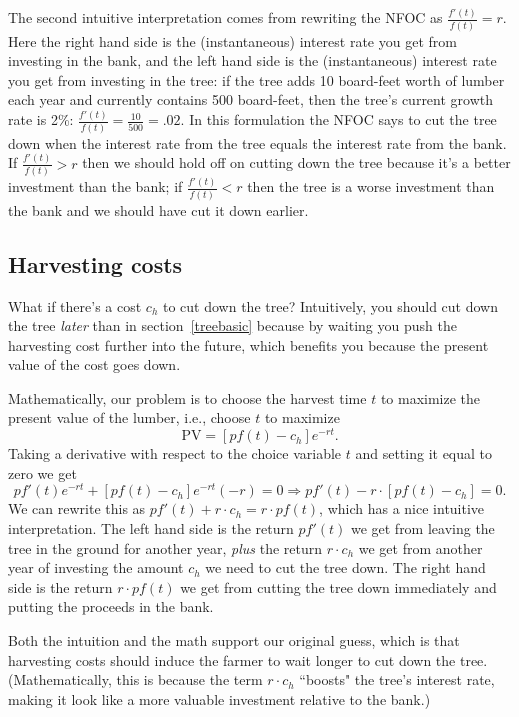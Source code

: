 The second intuitive interpretation comes from rewriting the NFOC as \linebreak $\displaystyle \frac{f'(t)}{f(t)}=r$. Here the right hand side is the (instantaneous) interest rate you get from investing in the bank, and the left hand side is the (instantaneous) interest rate you get from investing in the tree: if the tree adds 10 board-feet worth of lumber each year and currently contains 500 board-feet, then the tree's current growth rate is 2\%: $\displaystyle \frac{f'(t)}{f(t)}=\frac{10}{500}=.02.$ In this formulation the NFOC says to cut the tree down when the interest rate from the tree equals the interest rate from the bank. If $\displaystyle \frac{f'(t)}{f(t)}>r$ then we should hold off on cutting down the tree because it's a better investment than the bank; if $\displaystyle \frac{f'(t)}{f(t)}<r$ then the tree is a worse investment than the bank and we should have cut it down earlier.

\subsection*{Harvesting costs}

What if there's a cost $c_h$ to cut down the tree? Intuitively, you should cut down the tree \emph{later} than in section~\ref{treebasic} because by waiting you push the harvesting cost further into the future, which benefits you because the present value of the cost goes down.

Mathematically, our problem is to choose the harvest time $t$ to maximize the present value of the lumber, i.e., choose $t$ to maximize
\[
\mbox{PV}=[pf(t)-c_h]e^{-rt}.
\]
Taking a derivative with respect to the choice variable $t$ and setting it equal to zero we get
\[
pf'(t)e^{-rt} + [pf(t)-c_h]e^{-rt}(-r)=0\Longrightarrow pf'(t)-r\cdot [pf(t)-c_h]=0.
\]
We can rewrite this as $pf'(t)+ r\cdot c_h=r\cdot pf(t) $, which has a nice intuitive interpretation. The left hand side is the return $pf'(t)$ we get from leaving the tree in the ground for another year, \emph{plus} the return $r\cdot c_h$ we get from another year of investing the amount $c_h$ we need to cut the tree down. The right hand side is the return $r\cdot pf(t)$ we get from cutting the tree down immediately and putting the proceeds in the bank.

Both the intuition and the math support our original guess, which is that harvesting costs should induce the farmer to wait longer to cut down the tree. (Mathematically, this is because the term $r\cdot c_h$ ``boosts" the tree's interest rate, making it look like a more valuable investment relative to the bank.)

